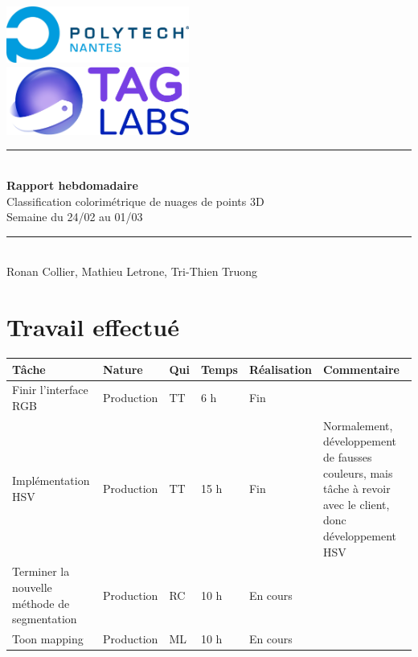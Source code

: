 \documentclass[12pt,titlepage,french]{article}
\begin{document}

\begin{titlepage}
\newcommand{\HRule}{\rule{\linewidth}{0.5mm}}
\center

  \includegraphics[width=0.45\textwidth]{../ressources/img_logos/logo_polytech.png}\\[1cm]
   
  \includegraphics[width=0.45\textwidth]{../ressources/img_logos/logo_taglabs.png}


\HRule \\[0.4cm]
{ \huge \bfseries Rapport hebdomadaire\\[0.15cm] }
Classification colorimétrique de nuages de points 3D\\
Semaine du 24/02 au 01/03
\HRule \\[1.5cm]
Ronan Collier,
Mathieu Letrone,
Tri-Thien Truong
\\[1cm]
\end{titlepage}

\section{Travail effectué}

\noindent\begin{tabularx}{17cm}{|p{2.5cm}|p{2.5cm}|p{1cm}|p{1.5cm}|p{2.5cm}|X|}
    \hline
    \textbf{Tâche} & \textbf{Nature} & \textbf{Qui} & \textbf{Temps} & \textbf{Réalisation} & \textbf{Commentaire} \\
    \hline
    Finir l'interface RGB & Production & TT & 6 h & Fin & \\
    \hline
    Implémentation HSV & Production & TT & 15 h & Fin & Normalement, développement de fausses couleurs, mais tâche à revoir avec le client, donc développement HSV\\
    \hline
    Terminer la nouvelle méthode de segmentation & Production & RC & 10 h & En cours & \\
    \hline
    Toon mapping & Production & ML & 10 h & En cours & \\
    \hline
\end{tabularx} \\
\end{document}
